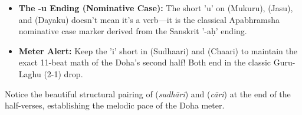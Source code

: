 \begin{tcolorbox}[gotchabox]
\begin{itemize}
    \item \textbf{The -u Ending (Nominative Case):} The short 'u' on  (Mukuru),  (Jasu), and  (Dayaku) doesn't mean it's a verb---it is the classical Apabhramsha nominative case marker derived from the Sanskrit '-aḥ' ending.
    \item \textbf{Meter Alert:} Keep the 'i' short in  (Sudhaari) and  (Chaari) to maintain the exact 11-beat math of the Doha's second half! Both end in the classic Guru-Laghu (2-1) drop.
\end{itemize}
\end{tcolorbox}

\begin{tcolorbox}[poetrybox]
Notice the beautiful structural pairing of  (\textit{sudhāri}) and  (\textit{cāri}) at the end of the half-verses, establishing the melodic pace of the Doha meter.
\end{tcolorbox}


\newpage
